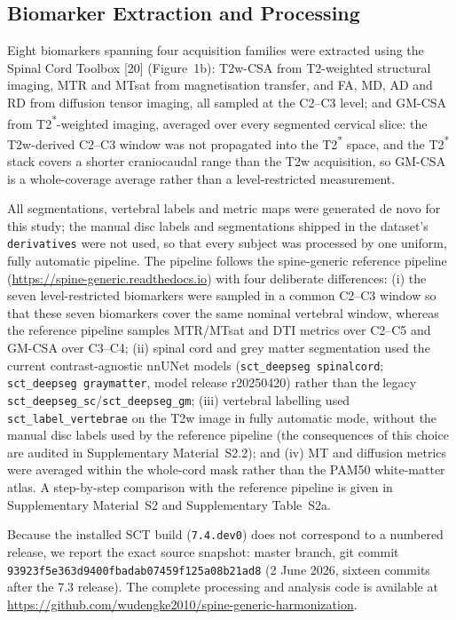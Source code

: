 \documentclass[12pt,a4paper]{article}
\begin{document}
\subsection{Biomarker Extraction and Processing}

Eight biomarkers spanning four acquisition families were extracted using the Spinal Cord Toolbox [20] (Figure~1b): T2w-CSA from T2-weighted structural imaging, MTR and MTsat from magnetisation transfer, and FA, MD, AD and RD from diffusion tensor imaging, all sampled at the C2--C3 level; and GM-CSA from T2\textsuperscript{*}-weighted imaging, averaged over every segmented cervical slice: the T2w-derived C2--C3 window was not propagated into the T2\textsuperscript{*} space, and the T2\textsuperscript{*} stack covers a shorter craniocaudal range than the T2w acquisition, so GM-CSA is a whole-coverage average rather than a level-restricted measurement.

All segmentations, vertebral labels and metric maps were generated de novo for this study; the manual disc labels and segmentations shipped in the dataset's \texttt{derivatives} were not used, so that every subject was processed by one uniform, fully automatic pipeline. The pipeline follows the spine-generic reference pipeline (\url{https://spine-generic.readthedocs.io}) with four deliberate differences: (i) the seven level-restricted biomarkers were sampled in a common C2--C3 window so that these seven biomarkers cover the same nominal vertebral window, whereas the reference pipeline samples MTR/MTsat and DTI metrics over C2--C5 and GM-CSA over C3--C4; (ii) spinal cord and grey matter segmentation used the current contrast-agnostic nnUNet models (\texttt{sct\_deepseg spinalcord}; \texttt{sct\_deepseg graymatter}, model release r20250420) rather than the legacy \texttt{sct\_deepseg\_sc}/\texttt{sct\_deepseg\_gm}; (iii) vertebral labelling used \texttt{sct\_label\_vertebrae} on the T2w image in fully automatic mode, without the manual disc labels used by the reference pipeline (the consequences of this choice are audited in Supplementary Material~S2.2); and (iv) MT and diffusion metrics were averaged within the whole-cord mask rather than the PAM50 white-matter atlas. A step-by-step comparison with the reference pipeline is given in Supplementary Material~S2 and Supplementary Table~S2a.

Because the installed SCT build (\texttt{7.4.dev0}) does not correspond to a numbered release, we report the exact source snapshot: master branch, git commit \texttt{93923f5e363d9400fbadab07459f125a08b21ad8} (2 June 2026, sixteen commits after the 7.3 release). The complete processing and analysis code is available at \url{https://github.com/wudengke2010/spine-generic-harmonization}.
\end{document}
